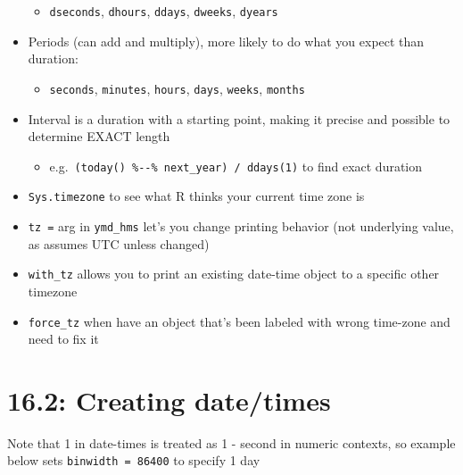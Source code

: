 \documentclass[]{book}
\providecommand{\tightlist}{%
  \setlength{\itemsep}{0pt}\setlength{\parskip}{0pt}}
\theoremstyle{definition}
\theoremstyle{definition}
\theoremstyle{definition}
\theoremstyle{remark}
\begin{document}
\begin{itemize}
  \begin{itemize}
  \tightlist
  \item
    \texttt{dseconds}, \texttt{dhours}, \texttt{ddays}, \texttt{dweeks},
    \texttt{dyears}
  \end{itemize}
\item
  Periods (can add and multiply), more likely to do what you expect than
  duration:

  \begin{itemize}
  \tightlist
  \item
    \texttt{seconds}, \texttt{minutes}, \texttt{hours}, \texttt{days},
    \texttt{weeks}, \texttt{months}
  \end{itemize}
\item
  Interval is a duration with a starting point, making it precise and
  possible to determine EXACT length

  \begin{itemize}
  \tightlist
  \item
    e.g.~\texttt{(today()\ \%-\/-\%\ next\_year)\ /\ ddays(1)} to find
    exact duration
  \end{itemize}
\item
  \texttt{Sys.timezone} to see what R thinks your current time zone is
\item
  \texttt{tz\ =} arg in \texttt{ymd\_hms} let's you change printing
  behavior (not underlying value, as assumes UTC unless changed)
\item
  \texttt{with\_tz} allows you to print an existing date-time object to
  a specific other timezone
\item
  \texttt{force\_tz} when have an object that's been labeled with wrong
  time-zone and need to fix it
\end{itemize}

\hypertarget{creating-datetimes}{%
\section{16.2: Creating date/times}\label{creating-datetimes}}

Note that 1 in date-times is treated as 1 - second in numeric contexts,
so example below sets \texttt{binwidth\ =\ 86400} to specify 1 day
\end{document}
